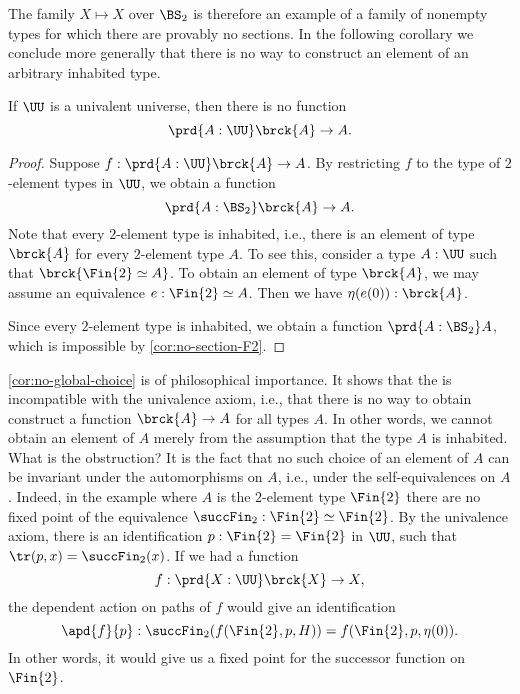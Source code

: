 The family $X\mapsto X$ over $\BS_2$ is therefore an example of a family of nonempty types for which there are provably no sections. In the following corollary we conclude more generally that there is no way to construct an element of an arbitrary inhabited type.

\begin{cor}\label{cor:no-global-choice}
  If $\UU$ is a univalent universe, then there is no  function
  \begin{equation*}
    \prd{A:\UU}\brck{A}\to A.
  \end{equation*}
\end{cor}

\begin{proof}
  Suppose $f:\prd{A:\UU}\brck{A}\to A$. By restricting $f$ to the type of $2$-element types in $\UU$, we obtain a function
  \begin{equation*}
    \prd{A:\BS_2}\brck{A}\to A.
  \end{equation*}
  Note that every $2$-element type is inhabited, i.e., there is an element of type $\brck{A}$ for every $2$-element type $A$. To see this, consider a type $A:\UU$ such that $\brck{\Fin{2}\simeq A}$. To obtain an element of type $\brck{A}$, we may assume an equivalence $e:\Fin{2}\simeq A$. Then we have $\eta(e(0)):\brck{A}$.

  Since every $2$-element type is inhabited, we obtain a function $\prd{A:\BS_2}A$, which is impossible by \cref{cor:no-section-F2}.
\end{proof}

\cref{cor:no-global-choice} is of philosophical importance. It shows that the  is incompatible with the univalence axiom, i.e., that there is no way to obtain construct a function $\brck{A}\to A$ for all types $A$. In other words, we cannot obtain an element of $A$ merely from the assumption that the type $A$ is inhabited. What is the obstruction? It is the fact that no such choice of an element of $A$ can be invariant under the automorphisms on $A$, i.e., under the self-equivalences on $A$. Indeed, in the example where $A$ is the $2$-element type $\Fin{2}$ there are no fixed point of the equivalence $\succFin_2:\Fin{2}\simeq\Fin{2}$. By the univalence axiom, there is an identification $p:\Fin{2}=\Fin{2}$ in $\UU$, such that $\tr(p,x)=\succFin_2(x)$. If we had a function
\begin{equation*}
  f:\prd{X:\UU}\brck{X}\to X,
\end{equation*}
the dependent action on paths of $f$ would give an identification
\begin{equation*}
  \apd{f}{p}:\succFin_2(f(\Fin{2},p,H))=f(\Fin{2},p,\eta(0)).
\end{equation*}
In other words, it would give us a fixed point for the successor function on $\Fin{2}$.

